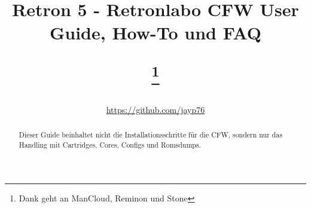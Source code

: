 \documentclass[a4paper]{article}
\title{Retron 5 - Retronlabo CFW User Guide, How-To und FAQ
\author{\url{https://github.com/jayp76}}
\thanks{Dank geht an ManCloud, Reminon und Stone}}
\begin{document}
\sffamily

\maketitle

\begin{abstract}
Dieser Guide beinhaltet nicht die Installationsschritte f\"ur die CFW, sondern nur das Handling mit Cartridges, Cores, Configs und Romsdumps.
\end{abstract}


\tableofcontents

\listoffigures

\listoftables

\end{document}
